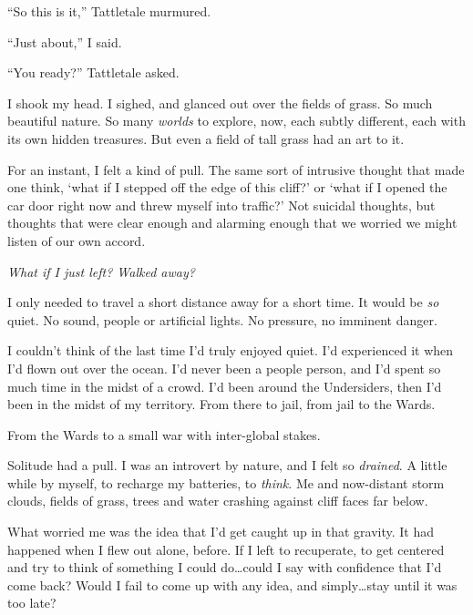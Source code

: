 





``So this is it,'' Tattletale murmured.



``Just about,'' I said.



``You ready?'' Tattletale asked.



I shook my head.  I sighed, and glanced out over the fields of grass.  So much beautiful nature.  So many \emph{worlds} to explore, now, each subtly different, each with its own hidden treasures.  But even a field of tall grass had an art to it.



For an instant, I felt a kind of pull.  The same sort of intrusive thought that made one think, `what if I stepped off the edge of this cliff?' or `what if I opened the car door right now and threw myself into traffic?'  Not suicidal thoughts, but thoughts that were clear enough and alarming enough that we worried we might listen of our own accord.



\emph{What if I just left?  Walked away}\emph{?}



I only needed to travel a short distance away for a short time.  It would be \emph{so} quiet.  No sound, people or artificial lights.  No pressure, no imminent danger.



I couldn't think of the last time I'd truly enjoyed quiet.  I'd experienced it when I'd flown out over the ocean.  I'd never been a people person, and I'd spent so much time in the midst of a crowd.  I'd been around the Undersiders, then I'd been in the midst of my territory.  From there to jail, from jail to the Wards.



From the Wards to a small war with inter-global stakes.



Solitude had a pull.  I was an introvert by nature, and I felt so \emph{drained}.  A little while by myself, to recharge my batteries, to \emph{think}.  Me and now-distant storm clouds, fields of grass, trees and water crashing against cliff faces far below.



What worried me was the idea that I'd get caught up in that gravity.  It had happened when I flew out alone, before.  If I left to recuperate, to get centered and try to think of something I could do\ldots could I say with confidence that I'd come back?  Would I fail to come up with any idea, and simply\ldots stay until it was too late?



